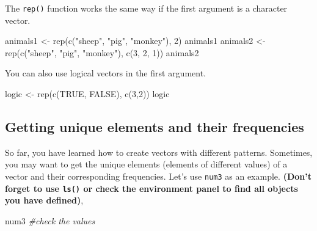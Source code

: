 \documentclass[
]{book}
\newenvironment{Shaded}{\begin{snugshade}}{\end{snugshade}}
\newcommand{\CommentTok}[1]{\textcolor[rgb]{0.56,0.35,0.01}{\textit{#1}}}
\newcommand{\ConstantTok}[1]{\textcolor[rgb]{0.00,0.00,0.00}{#1}}
\newcommand{\DecValTok}[1]{\textcolor[rgb]{0.00,0.00,0.81}{#1}}
\newcommand{\FunctionTok}[1]{\textcolor[rgb]{0.00,0.00,0.00}{#1}}
\newcommand{\NormalTok}[1]{#1}
\newcommand{\OtherTok}[1]{\textcolor[rgb]{0.56,0.35,0.01}{#1}}
\newcommand{\StringTok}[1]{\textcolor[rgb]{0.31,0.60,0.02}{#1}}
\begin{document}
The \texttt{rep()} function works the same way if the first argument is a character vector.

\begin{Shaded}
\begin{Highlighting}[]
\NormalTok{animals1 }\OtherTok{\textless{}{-}} \FunctionTok{rep}\NormalTok{(}\FunctionTok{c}\NormalTok{(}\StringTok{"sheep"}\NormalTok{, }\StringTok{"pig"}\NormalTok{, }\StringTok{"monkey"}\NormalTok{), }\DecValTok{2}\NormalTok{)}
\NormalTok{animals1}
\NormalTok{animals2 }\OtherTok{\textless{}{-}} \FunctionTok{rep}\NormalTok{(}\FunctionTok{c}\NormalTok{(}\StringTok{"sheep"}\NormalTok{, }\StringTok{"pig"}\NormalTok{, }\StringTok{"monkey"}\NormalTok{), }\FunctionTok{c}\NormalTok{(}\DecValTok{3}\NormalTok{, }\DecValTok{2}\NormalTok{, }\DecValTok{1}\NormalTok{))}
\NormalTok{animals2}
\end{Highlighting}
\end{Shaded}

You can also use logical vectors in the first argument.

\begin{Shaded}
\begin{Highlighting}[]
\NormalTok{logic }\OtherTok{\textless{}{-}} \FunctionTok{rep}\NormalTok{(}\FunctionTok{c}\NormalTok{(}\ConstantTok{TRUE}\NormalTok{, }\ConstantTok{FALSE}\NormalTok{), }\FunctionTok{c}\NormalTok{(}\DecValTok{3}\NormalTok{,}\DecValTok{2}\NormalTok{))}
\NormalTok{logic}
\end{Highlighting}
\end{Shaded}

\hypertarget{getting-unique-elements-and-their-frequencies}{%
\subsection{Getting unique elements and their frequencies}\label{getting-unique-elements-and-their-frequencies}}

So far, you have learned how to create vectors with different patterns. Sometimes, you may want to get the unique elements (elements of different values) of a vector and their corresponding frequencies. Let's use \texttt{num3} as an example. \textbf{(Don't forget to use \texttt{ls()} or check the environment panel to find all objects you have defined)},

\begin{Shaded}
\begin{Highlighting}[]
\NormalTok{num3           }\CommentTok{\#check the values}
\end{Highlighting}
\end{Shaded}
\end{document}
